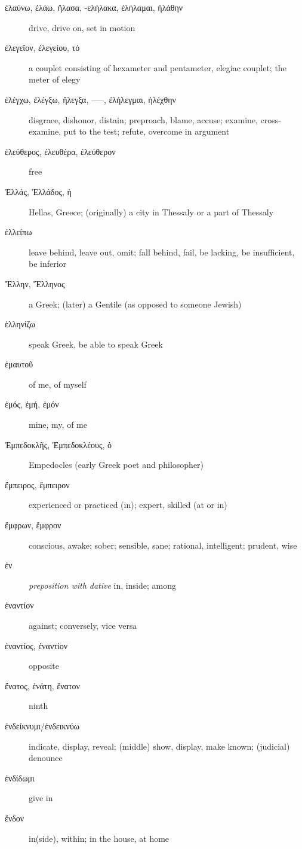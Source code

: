 \documentclass[12pt,letterpaper]{article}
\begin{document}
\begin{description}
    \item[\textgreek{ἐλαύνω, ἐλάω, ἤλασα, -ελήλακα, ἐλήλαμαι, ἠλάθην}] \marginnote{*}drive, drive on, set in motion
    \item[\textgreek{ἐλεγεῖον, ἐλεγείου, τό}] a couplet consisting of hexameter and pentameter, elegiac couplet; the meter of elegy
    \item[\textgreek{ἐλέγχω, ἐλέγξω, ἤλεγξα, –––, ἐλήλεγμαι, ἠλέχθην}] disgrace, dishonor, distain; preproach, blame, accuse; examine, cross-examine, put to the test; refute, overcome in argument
    \item[\textgreek{ἐλεύθερος, ἐλευθέρα, ἐλεύθερον}] \marginnote{*}free
    \item[\textgreek{Ἑλλάς, Ἑλλάδος, ἡ}] Hellas, Greece; (originally) a city in Thessaly or a part of Thessaly
    \item[\textgreek{ἐλλείπω}] leave behind, leave out, omit; fall behind, fail, be lacking, be insufficient, be inferior
    \item[\textgreek{Ἕλλην, Ἕλληνος}] a Greek; (later) a Gentile (as opposed to someone Jewish)
    \item[\textgreek{ἑλληνίζω}] speak Greek, be able to speak Greek
    \item[\textgreek{ἐμαυτοῦ}] of me, of myself
    \item[\textgreek{ἐμός, ἐμή, ἐμόν}] mine, my, of me
    \item[\textgreek{Ἐμπεδοκλῆς, Ἐμπεδοκλέους, ὁ}] Empedocles (early Greek poet and philosopher)
    \item[\textgreek{ἔμπειρος, ἔμπειρον}] experienced or practiced (in); expert, skilled (at or in)
    \item[\textgreek{ἔμφρων, ἔμφρον}] conscious, awake; sober; sensible, sane; rational, intelligent; prudent, wise
    \item[\textgreek{ἐν}] \marginnote{*}\textit{preposition with dative} in, inside; among
    \item[\textgreek{ἐναντίον}] against; conversely, vice versa
    \item[\textgreek{ἐναντίος, ἐναντίον}] \marginnote{*}opposite
    \item[\textgreek{ἔνατος, ἐνάτη, ἔνατον}] \marginnote{*}ninth
    \item[\textgreek{ἐνδείκνυμι/ἐνδεικνύω}] indicate, display, reveal; (middle) show, display, make known; (judicial) denounce
    \item[\textgreek{ἐνδίδωμι}] give in
    \item[\textgreek{ἔνδον}] in(side), within; in the house, at home

\end{description}
\end{document}
